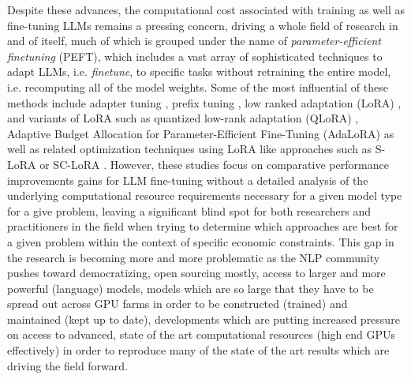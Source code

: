 \documentclass[final]{clv2025-revised}
\begin{document}
Despite these advances, the computational cost associated with training as well as fine-tuning LLMs remains a pressing concern, driving a whole field of research in and of itself, much of which is grouped under the name of \textit{parameter-efficient finetuning} (PEFT), which includes a vast array of sophisticated techniques to adapt LLMs, i.e. \textit{finetune}, to specific tasks without retraining the entire model, i.e. recomputing all of the model weights. Some of the most influential of these methods include adapter tuning \cite{pmlr-v97-houlsby19a}, prefix tuning \cite{li2021prefixtuningoptimizingcontinuousprompts}, low ranked adaptation (LoRA) \cite{hu2021loralowrankadaptationlarge}, and variants of LoRA such as quantized low-rank adaptation (QLoRA) \cite{dettmers2023qloraefficientfinetuningquantized}, Adaptive Budget Allocation for Parameter-Efficient Fine-Tuning (AdaLoRA) \cite{zhang2023adaloraadaptivebudgetallocation} as well as related optimization techniques using LoRA like approaches such as S-LoRA \cite{sheng2024sloraservingthousandsconcurrent} or SC-LoRA \cite{luo2025sclorabalancingefficientfinetuning}. However, these studies focus on comparative performance improvements gains for LLM fine-tuning without a detailed analysis of the underlying computational resource requirements necessary for a given model type for a give problem, leaving a significant blind spot for both researchers and practitioners in the field when trying to determine which approaches are best for a given problem within the context of specific economic constraints. This gap in the research is becoming more and more problematic as the NLP community pushes toward democratizing, open sourcing mostly, access to larger and more powerful (language) models, models which are so large that they have to be spread out across GPU farms in order to be constructed (trained) and maintained (kept up to date), developments which are putting increased pressure on access to advanced, state of the art computational resources (high end GPUs effectively) in order to reproduce many of the state of the art results which are driving the field forward.
\end{document}
